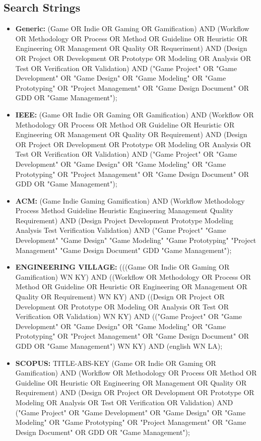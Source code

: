 \documentclass [11pt]{article}
\begin{document}
\subsection{Search Strings}
\begin{itemize}
\item \textbf{Generic: }(Game OR Indie OR Gaming OR Gamification) AND (Workflow OR Methodology OR Process OR Method OR Guideline OR Heuristic OR Engineering OR Management OR Quality OR Requeriment) AND (Design OR Project OR Development OR Prototype OR Modeling OR Analysis OR Test OR Verification OR Validation) AND ("Game Project" OR "Game Development" OR "Game Design" OR "Game Modeling" OR "Game Prototyping" OR "Project Management" OR "Game Design Document" OR GDD OR "Game Management"); 
\item \textbf{IEEE: }(Game OR Indie OR Gaming OR Gamification) AND (Workflow OR Methodology OR Process OR Method OR Guideline OR Heuristic OR Engineering OR Management OR Quality OR Requirement) AND (Design OR Project OR Development OR Prototype OR Modeling OR Analysis OR Test OR Verification OR Validation) AND ("Game Project" OR "Game Development" OR "Game Design" OR "Game Modeling" OR "Game Prototyping" OR "Project Management" OR "Game Design Document" OR GDD OR "Game Management"); 
\item \textbf{ACM: }(Game Indie Gaming Gamification) AND (Workflow Methodology Process Method Guideline Heuristic Engineering Management Quality Requirement) AND (Design Project Development Prototype Modeling Analysis Test Verification Validation) AND ("Game Project" "Game Development" "Game Design" "Game Modeling" "Game Prototyping" "Project Management" "Game Design Document" GDD "Game Management"); 
\item \textbf{ENGINEERING VILLAGE: }(((Game OR Indie OR Gaming OR Gamification) WN KY) AND ((Workflow OR Methodology OR Process OR Method OR Guideline OR Heuristic OR Engineering OR Management OR Quality OR Requirement) WN KY) AND ((Design OR Project OR Development OR Prototype OR Modeling OR Analysis OR Test OR Verification OR Validation) WN KY) AND (("Game Project" OR "Game Development" OR "Game Design" OR "Game Modeling" OR "Game Prototyping" OR "Project Management" OR "Game Design Document" OR GDD OR "Game Management") WN KY) AND ({english} WN LA); 
\item \textbf{SCOPUS: }TITLE-ABS-KEY (Game OR Indie OR Gaming OR Gamification) AND (Workflow OR Methodology OR Process OR Method OR Guideline OR Heuristic OR Engineering OR Management OR Quality OR Requirement) AND (Design OR Project OR Development OR Prototype OR Modeling OR Analysis OR Test OR Verification OR Validation) AND ("Game Project" OR "Game Development" OR "Game Design" OR "Game Modeling" OR "Game Prototyping" OR "Project Management" OR "Game Design Document" OR GDD OR "Game Management"); 
\end{itemize}
\end{document}
